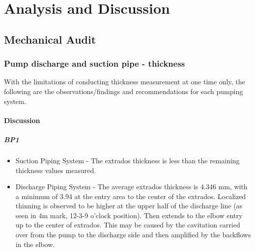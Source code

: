 \chapter{Analysis and Discussion} %
\label{Chapter5}
\section{Mechanical Audit}
\label{42}
\subsection{Pump discharge and suction pipe - thickness} \label{ch05mech01}

With the limitations of conducting thickness measurement at one time only, the following are the observations/findings and recommendations for each pumping system.

\subsubsection{Discussion}

\paragraph{\textbf{BP1}}
\begin{itemize}
\item Suction Piping System - The extrados thickness is less than the remaining thickness values measured.
\item 	Discharge Piping System - The average extrados thickness is 4.346 mm, with a minimum of 3.94 at the entry area to the center of the extrados. Localized thinning is observed to be higher at the upper half of the discharge line (as seen in 4m mark, 12-3-9 o'clock position). Then extends to the elbow entry up to the center of extrados. This may be caused by the cavitation carried over from the pump to the discharge side and then amplified by the backflows in the elbow.
\end{itemize}


